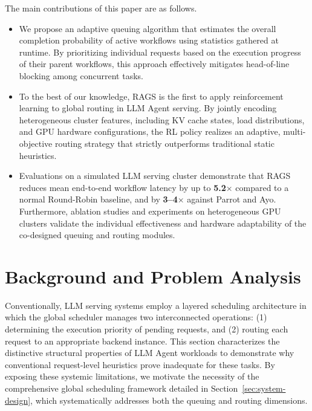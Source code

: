 \documentclass[sigconf,review,anonymous]{acmart}
\begin{document}
The main contributions of this paper are as follows.
\begin{itemize}
  \item We propose an adaptive queuing algorithm that estimates the overall completion 
        probability of active workflows using statistics gathered at runtime. 
        By prioritizing individual requests based on the execution progress of their 
        parent workflows, this approach effectively mitigates head-of-line blocking among 
        concurrent tasks.

  \item To the best of our knowledge, RAGS is the first to apply reinforcement learning 
        to global routing in LLM Agent serving. By jointly encoding heterogeneous cluster features, 
        including KV cache states, load distributions, and GPU hardware configurations, 
        the RL policy realizes an adaptive, multi-objective routing strategy that strictly 
        outperforms traditional static heuristics.

  \item Evaluations on a simulated LLM serving cluster demonstrate that RAGS reduces mean 
        end-to-end workflow latency by up to \textbf{5.2$\times$} compared to a normal  
        Round-Robin baseline, and by \textbf{3--4$\times$} against Parrot and Ayo. Furthermore, 
        ablation studies and experiments on heterogeneous GPU clusters validate the individual 
        effectiveness and hardware adaptability of the co-designed queuing and routing modules.
\end{itemize}

\section{Background and Problem Analysis}
\label{sec:background-and-problem-analysis}

Conventionally, LLM serving systems employ a layered scheduling architecture in which 
the global scheduler manages two interconnected operations: (1) determining 
the execution priority of pending requests, and (2) routing each request to an 
appropriate backend instance. This section characterizes the distinctive structural 
properties of LLM Agent workloads to demonstrate why conventional request-level 
heuristics prove inadequate for these tasks. By exposing these systemic limitations, 
we motivate the necessity of the comprehensive global scheduling framework detailed 
in Section~\ref{sec:system-design}, which systematically addresses both the queuing 
and routing dimensions.
\end{document}
